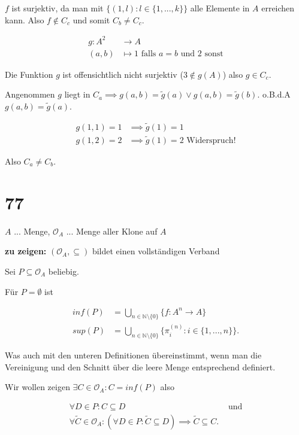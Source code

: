 \documentclass[]{article}
\begin{document}
$f$ ist surjektiv, da man mit $\{(1, l): l \in \{1, ..., k\}\}$ alle Elemente in $A$ erreichen kann. Also $f \notin C_c$ und somit $C_b \neq C_c$.


\begin{align*}
	g:A^2 &\rightarrow A\\
	(a, b) &\mapsto 1 \text{ falls } a=b \text{ und } 2 \text{ sonst}
\end{align*}

Die Funktion $g$ ist offensichtlich nicht surjektiv ($3 \notin g(A)$) also $g \in C_c$.

Angenommen $g$ liegt in $C_a \implies g(a,b)=\tilde{g}(a) \lor g(a,b)=\tilde{g}(b)$. o.B.d.A $g(a,b)=\tilde{g}(a)$.

\begin{align*}
	g(1, 1) = 1 &\implies \tilde{g}(1) = 1\\
	g(1, 2) = 2 &\implies \tilde{g}(1) = 2 \text{ Widerspruch!}
\end{align*}

Also $C_a \neq C_b$.
\newpage

\section{77}
$A$ ... Menge, $\mathcal{O}_A$ ... Menge aller Klone auf $A$

\noindent
\textbf{zu zeigen: } $(\mathcal{O}_A, \subseteq)$ bildet einen vollständigen Verband

Sei $P \subseteq \mathcal{O}_A$ beliebig.

Für $P = \emptyset$ ist

\begin{align*}
	inf(P) &= \bigcup_{n\in\mathbb{N}\setminus\{0\}}\{f:A^n\rightarrow A\} \\
	sup(P) &= \bigcup_{n\in\mathbb{N}\setminus\{0\}}\{\pi_i^{(n)}: i\in \{1, ..., n\}\}.
\end{align*}
 
Was auch mit den unteren Definitionen übereinstimmt, wenn man die Vereinigung und den Schnitt über die leere Menge entsprechend definiert.
 
Wir wollen zeigen $\exists C \in \mathcal{O}_A: C = inf(P)$ also

\begin{align*}
	\forall D \in P: C \subseteq D & \text{ und}\\
	\forall \tilde{C} \in \mathcal{O}_A:(\forall D \in P: \tilde{C} \subseteq D) \implies \tilde{C} \subseteq C.
\end{align*}
\end{document}
